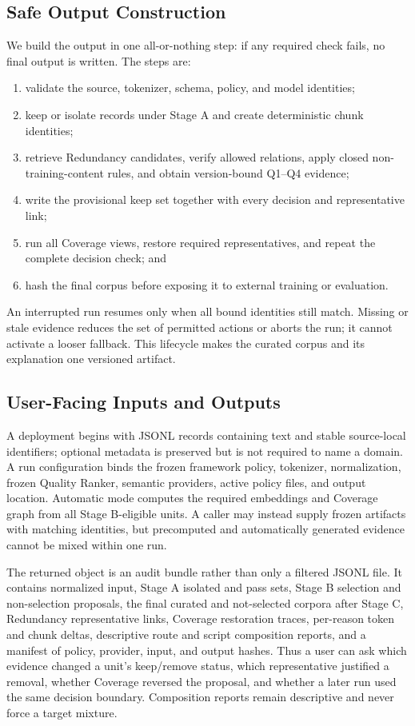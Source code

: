 \documentclass[conference]{IEEEtran}
\begin{document}
\subsection{Safe Output Construction}
We build the output in one all-or-nothing step: if any required check fails,
no final output is written. The steps are:
\begin{enumerate}
  \item validate the source, tokenizer, schema, policy, and model identities;
  \item keep or isolate records under Stage A and create deterministic
  chunk identities;
  \item retrieve Redundancy candidates, verify allowed relations, apply closed
  non-training-content rules, and obtain version-bound Q1--Q4 evidence;
  \item write the provisional keep set together with every decision and
  representative link;
  \item run all Coverage views, restore required representatives, and repeat
  the complete decision check; and
  \item hash the final corpus before exposing it to external training or
  evaluation.
\end{enumerate}
An interrupted run resumes only when all bound identities still match. Missing
or stale evidence reduces the set of permitted actions or aborts the run; it
cannot activate a looser fallback. This lifecycle makes the curated corpus and
its explanation one versioned artifact.

\subsection{User-Facing Inputs and Outputs}
A deployment begins with JSONL records containing text and stable source-local
identifiers; optional metadata is preserved but is not required to name a
domain. A run configuration binds the frozen framework policy, tokenizer,
normalization, frozen Quality Ranker, semantic providers, active policy files,
and output location. Automatic mode computes the required embeddings and
Coverage graph from all Stage B-eligible units. A caller may instead supply frozen
artifacts with matching identities, but precomputed and automatically generated
evidence cannot be mixed within one run.

The returned object is an audit bundle rather than only a filtered JSONL file.
It contains normalized input, Stage A isolated and pass sets, Stage B
selection and non-selection proposals, the final curated and not-selected
corpora after Stage C, Redundancy representative links, Coverage restoration
traces, per-reason token and chunk deltas, descriptive route and script
composition reports, and a manifest of policy, provider, input, and output
hashes. Thus a user can ask which evidence changed a unit's keep/remove status, which
representative justified a removal, whether Coverage reversed the proposal, and
whether a later run used the same decision boundary. Composition reports remain
descriptive and never force a target mixture.
\end{document}
